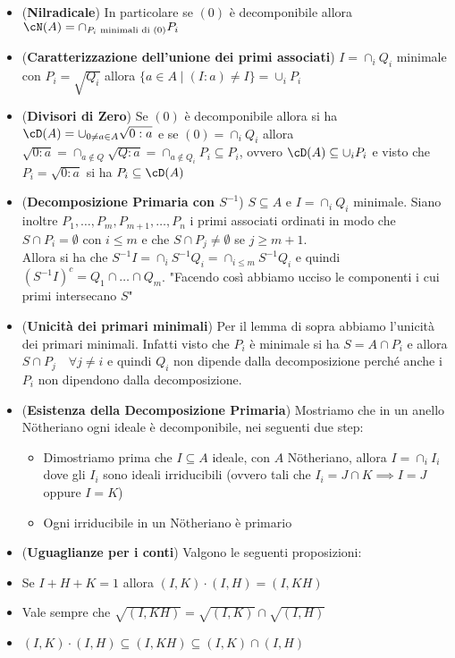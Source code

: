 \documentclass[a4paper,NoNotes,GeneralMath]{stdmdoc}
\begin{document}
\begin{itemize}
		\item ({\bf Nilradicale}) In particolare se $(0)$ è decomponibile allora $\cN(A) = \cap_{P_i \text{ minimali di } (0)} P_i$
		\item ({\bf Caratterizzazione dell'unione dei primi associati}) $I = \cap_i Q_i$ minimale con $P_i = \sqrt{Q_i}$ allora $\{ a \in A \mid (I:a) \neq I \} = \cup_i P_i$
		\item ({\bf Divisori di Zero}) Se $(0)$ è decomponibile allora si ha $\cD(A) = \cup_{0 \neq a \in A} \sqrt{0 : a}$ e se $(0) = \cap_i Q_i$ allora $\sqrt{0:a} = \cap_{a \notin Q} \sqrt{Q:a} = \cap_{a \notin Q_i} P_i \subseteq P_i$, ovvero $\cD(A) \subseteq \cup_i P_i$ e visto che $P_i = \sqrt{0:a}$ si ha $P_i \subseteq \cD(A)$
		\item ({\bf Decomposizione Primaria con $S^{-1}$}) $S \subseteq A$ e $I = \cap_i Q_i$ minimale. Siano inoltre $P_1, \ldots, P_m, P_{m+1}, \ldots, P_n$ i primi associati ordinati in modo che $S \cap P_i = \emptyset$ con $i \le m$ e che $S \cap P_j \neq \emptyset$ se $j \ge m+1$. \\
		Allora si ha che $S^{-1}I = \cap_i S^{-1}Q_i = \cap_{i \le m} S^{-1}Q_i$ e quindi $(S^{-1}I)^c = Q_1 \cap \ldots \cap Q_m$. "Facendo così abbiamo ucciso le componenti i cui primi intersecano $S$" 
		\item ({\bf Unicità dei primari minimali}) Per il lemma di sopra abbiamo l'unicità dei primari minimali. Infatti visto che $P_i$ è minimale si ha $S = A \cap P_i$ e allora $S \cap P_j \quad \forall j \neq i$ e quindi $Q_i$ non dipende dalla decomposizione perché anche i $P_i$ non dipendono dalla decomposizione.
		\item ({\bf Esistenza della Decomposizione Primaria}) Mostriamo che in un anello Nötheriano ogni ideale è decomponibile, nei seguenti due step:
			\begin{itemize}
				\item Dimostriamo prima che $I \subseteq A$ ideale, con $A$ Nötheriano, allora $I = \cap_i I_i$ dove gli $I_i$ sono ideali irriducibili (ovvero tali che $I_i = J \cap K \implies I = J$ oppure $I = K$)
				\item Ogni irriducibile in un Nötheriano è primario
			\end{itemize}
		\item ({\bf Uguaglianze per i conti}) Valgono le seguenti proposizioni:
			\item Se $I + H + K = 1$ allora $(I, K) \cdot (I, H) = (I, KH)$
			\item Vale sempre che $\sqrt{(I, KH)} = \sqrt{(I, K)} \cap \sqrt{(I, H)}$
			\item $(I, K) \cdot (I, H) \subseteq (I, KH) \subseteq (I, K) \cap (I, H)$
	\end{itemize}
	
\end{document}
